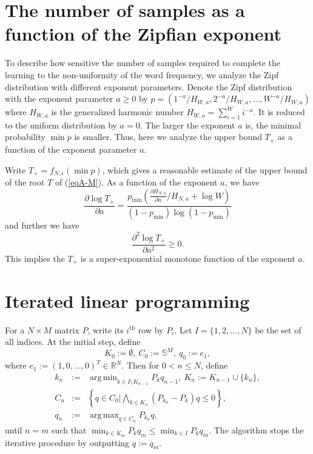 \documentclass[a4paper,natbib,man]{apa6}
\newcommand{\Simplex}[1]{\mathbb{S}^{#1}}
\DeclareMathOperator*{\argmin}{arg\,min} %
\DeclareMathOperator*{\argmax}{arg\,max} %
\begin{document}
\section{The number of samples as a function of the Zipfian exponent}
To describe how sensitive the number of samples required to complete the learning to the non-uniformity of the word frequency, we analyze the Zipf distribution with different exponent parameters.
Denote the Zipf distribution with the exponent parameter $a \ge 0$ 
by $p = (1^{-a}/H_{W,a}, 2^{-a}/H_{W,a}, \ldots, W^{-a}/ H_{W,a})$
where $H_{W,a}$ is the generalized harmonic number $H_{W,a} = \sum_{i=1}^{W}i^{-a}$.
It is reduced to the uniform distribution by $a = 0$.
The larger the exponent $a$ is, the minimal probability $\min p$ is smaller.
Thus, here we analyze the upper bound $T_{+}$ as a function of the exponent parameter $a$.

Write $T_{+} = f_{N, \epsilon}( \min p )$, which gives a reasonable estimate of the upper bound of the root $T$ of (\ref{eqA-M}).
As a function of the exponent $a$, we have 
\[
 \frac{\partial \log T_{+} %
 }{ \partial a }
= 
 \frac{ 
p_{\min} 
\left( \frac{ \partial H_{N, a} }{ \partial a}/ H_{N, a} + \log W \right)
}{ ( 1 - p_{\min} ) \log\left( 1 - p_{\min} \right) } 
\]
and further we have
\[
 \frac{\partial^2 \log T_{+} %
 }{ \partial a^2 }
\ge 0.
\]
This implies the $T_{+}$ is a super-exponential monotone function of the exponent $a$.

\section{Iterated linear programming}
For a $N \times M$ matrix $P$, write its $i^{\text{th}}$ row by $P_{i}$.
Let $I = \{1, 2, \ldots, N\}$ be the set of all indices.
At the initial step, define 
\[
K_{0} := \emptyset,\ C_{0} := \Simplex{M},\ q_{0} := e_{1},
\]
where $e_{1} := (1, 0, \ldots, 0 )^{T} \in \mathbb{R}^{N}$.
Then for $0 < n \le N$, 
define
\begin{eqnarray}
\nonumber
k_{n} &:=& \argmin_{k \in I \setminus K_{n-1}} P_{k} q_{n-1},\ K_{n} := K_{n-1} \cup \{k_n\},
\\
\nonumber
C_{n} &:=& \left\{q \in C_{0} | \bigwedge_{k \in K_{n}}(P_{k_{n}} - P_{k})q\le 0 \right\},
\\
\nonumber
q_{n} &:=& \argmax_{q \in C_{n}} P_{k_n}q,
\end{eqnarray}
until $n = m$ such that 
$\min_{k \in K_{m}} P_{k} q_{m} \le \min_{k \in I } P_{k} q_{m}$.
The algorithm stops the iterative procedure by outputting $q:= q_{m}$.
\end{document}
